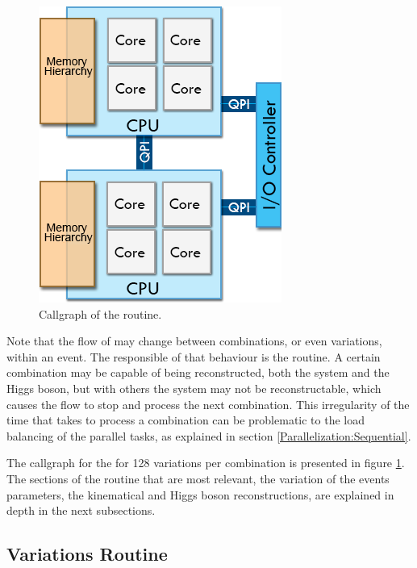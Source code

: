\begin{figure}[!htp]
	\begin{center}
		\includegraphics[scale=0.5]{../../common/img/numa_qpi.png}
		\caption{Callgraph of the \ttDilepKinFit routine.}
		\label{fig:CallgraphKinFit}
	\end{center}
\end{figure}

Note that the flow of \ttDilepKinFit may change between combinations, or even variations, within an event. The responsible of that behaviour is the \dilep routine. A certain combination may be capable of being reconstructed, both the \ttbar system and the Higgs boson, but with others the \ttbar system may not be reconstructable, which causes the \ttDilepKinFit flow to stop and process the next combination. This irregularity of the time that takes to process a combination can be problematic to the load balancing of the parallel tasks, as explained in section \ref{Parallelization:Sequential}.

The callgraph for the \ttDilepKinFit for 128 variations per combination is presented in figure \ref{fig:CallgraphKinFit}. The sections of the routine that are most relevant, the variation of the events parameters, the kinematical and Higgs boson reconstructions, are explained in depth in the next subsections.

\subsection{Variations Routine}
\label{Application:Variations}

